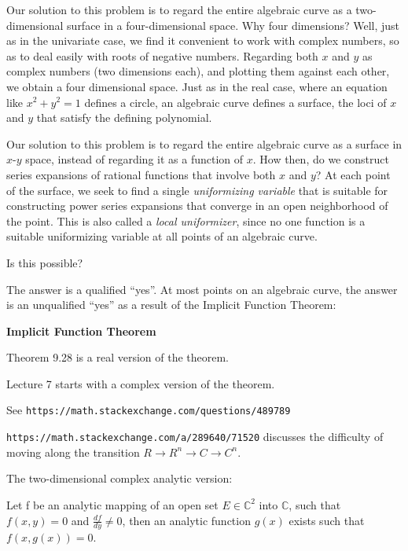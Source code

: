 Our solution to this problem is to regard the entire algebraic curve
as a two-dimensional surface in a four-dimensional space.  Why four
dimensions?  Well, just as in the univariate case, we find it
convenient to work with complex numbers, so as to deal easily with
roots of negative numbers.  Regarding both $x$ and $y$ as complex
numbers (two dimensions each), and plotting them against each other,
we obtain a four dimensional space.  Just as in the real case, where
an equation like $x^2 + y^2 = 1$ defines a circle, an algebraic curve
defines a surface, the loci of $x$ and $y$ that satisfy the defining
polynomial.



Our solution to this problem is to regard the entire algebraic curve
as a surface in $x$-$y$ space, instead of regarding it as a function
of $x$.  How then, do we construct series expansions of rational
functions that involve both $x$ and $y$?  At each point of the
surface, we seek to find a single {\it uniformizing variable} that is
suitable for constructing power series expansions that converge in
an open neighborhood of the point.  This is also
called a {\it local uniformizer}, since no one function is a suitable
uniformizing variable at all points of an algebraic curve.


Is this possible?

The answer is a qualified ``yes''.  At most points on an algebraic
curve, the answer is an unqualified ``yes'' as a result of the
Implicit Function Theorem:

\theorem
{\bf Implicit Function Theorem}
\label{implicit function theorem}

\cite{baby rudin} Theorem 9.28 is a real version of the theorem.

\cite{guillemin} Lecture 7 starts with a complex version of the theorem.

See {\tt https://math.stackexchange.com/questions/489789}

{\tt https://math.stackexchange.com/a/289640/71520} discusses the
difficulty of moving along the transition $R \to R^n \to C \to C^n$.

The two-dimensional complex analytic version:

Let f be an analytic
mapping of an open set $E \in {\mathbb C}^2$ into ${\mathbb C}$, such
that $f(x,y)=0$ and $\frac{df}{dy} \ne 0$, then an analytic
function $g(x)$ exists such that $f(x,g(x))=0$.
\endtheorem


